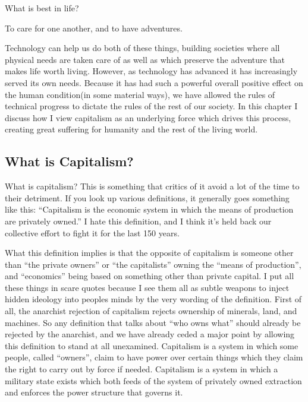 What is best in life?

To care for one another, and to have adventures.

Technology can help us do both of these things, building societies where
all physical needs are taken care of as well as which preserve the
adventure that makes life worth living. However, as technology has
advanced it has increasingly served its own needs. Because it has had
such a powerful overall positive effect on the human condition(in some
material ways), we have allowed the rules of technical progress to
dictate the rules of the rest of our society. In this chapter I discuss
how I view capitalism as an underlying force which drives this process,
creating great suffering for humanity and the rest of the living world.

\subsection{What is Capitalism?}\label{what-is-capitalism}

What is capitalism? This is something that critics of it avoid a lot of
the time to their detriment. If you look up various definitions, it
generally goes something like this: ``Capitalism is the economic system
in which the means of production are privately owned.'' I hate this
definition, and I think it's held back our collective effort to fight it
for the last 150 years.

What this definition implies is that the opposite of capitalism is
someone other than ``the private owners'' or ``the capitalists'' owning
the ``means of production'', and ``economics'' being based on something
other than private capital. I put all these things in scare quotes
because I see them all as subtle weapons to inject hidden ideology into
peoples minds by the very wording of the definition. First of all, the
anarchist rejection of capitalism rejects ownership of minerals, land,
and machines. So any definition that talks about ``who owns what''
should already be rejected by the anarchist, and we have already ceded a
major point by allowing this definition to stand at all unexamined.
Capitalism is a system in which some people, called ``owners'', claim to
have power over certain things which they claim the right to carry out
by force if needed. Capitalism is a system in which a military state
exists which both feeds of the system of privately owned extraction and
enforces the power structure that governs it.

